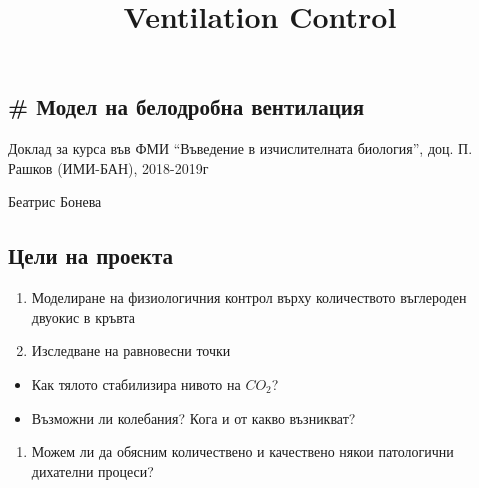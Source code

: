 \documentclass[11pt]{article}
\title{Ventilation Control}
\providecommand{\tightlist}{%
      \setlength{\itemsep}{0pt}\setlength{\parskip}{0pt}}
\begin{document}
    
    
    \maketitle
    
    

    
    \hypertarget{ux43cux43eux434ux435ux43b-ux43dux430-ux431ux435ux43bux43eux434ux440ux43eux431ux43dux430-ux432ux435ux43dux442ux438ux43bux430ux446ux438ux44f}{%
\subsection{\# Модел на белодробна
вентилация}\label{ux43cux43eux434ux435ux43b-ux43dux430-ux431ux435ux43bux43eux434ux440ux43eux431ux43dux430-ux432ux435ux43dux442ux438ux43bux430ux446ux438ux44f}}

Доклад за курса във ФМИ ``Въведение в изчислителната биология'', доц. П.
Рашков (ИМИ-БАН), 2018-2019г

Беатрис Бонева

    \hypertarget{ux446ux435ux43bux438-ux43dux430-ux43fux440ux43eux435ux43aux442ux430}{%
\subsection{Цели на
проекта}\label{ux446ux435ux43bux438-ux43dux430-ux43fux440ux43eux435ux43aux442ux430}}

\begin{enumerate}
\def\labelenumi{\arabic{enumi}.}
\tightlist
\item
  Моделиране на физиологичния контрол върху количеството въглероден
  двуокис в кръвта
\item
  Изследване на равновесни точки
\end{enumerate}

\begin{itemize}
\tightlist
\item
  Как тялото стабилизира нивото на \(CO_2\)?
\item
  Възможни ли колебания? Кога и от какво възникват?
\end{itemize}

\begin{enumerate}
\def\labelenumi{\arabic{enumi}.}
\setcounter{enumi}{2}
\tightlist
\item
  Можем ли да обясним количествено и качествено някои патологични
  дихателни процеси?
\end{enumerate}
\end{document}
